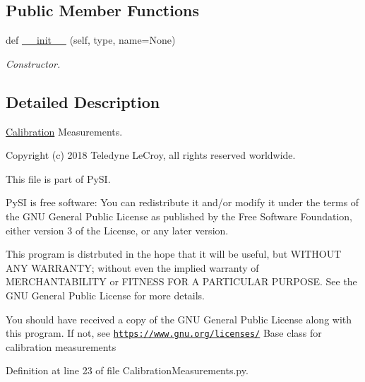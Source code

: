 \subsection*{Public Member Functions}
\begin{DoxyCompactItemize}
\item 
def \hyperlink{classSignalIntegrity_1_1Measurement_1_1Calibration_1_1CalibrationMeasurements_1_1CalibrationMeasurement_a1ddf400813e458d6de6ee54246f050e7}{\+\_\+\+\_\+init\+\_\+\+\_\+} (self, type, name=None)
\begin{DoxyCompactList}\small\item\em Constructor. \end{DoxyCompactList}\end{DoxyCompactItemize}


\subsection{Detailed Description}
\hyperlink{namespaceSignalIntegrity_1_1Measurement_1_1Calibration_1_1Calibration}{Calibration} Measurements. 

Copyright (c) 2018 Teledyne Le\+Croy, all rights reserved worldwide.

This file is part of Py\+SI.

Py\+SI is free software\+: You can redistribute it and/or modify it under the terms of the G\+NU General Public License as published by the Free Software Foundation, either version 3 of the License, or any later version.

This program is distrbuted in the hope that it will be useful, but W\+I\+T\+H\+O\+UT A\+NY W\+A\+R\+R\+A\+N\+TY; without even the implied warranty of M\+E\+R\+C\+H\+A\+N\+T\+A\+B\+I\+L\+I\+TY or F\+I\+T\+N\+E\+SS F\+OR A P\+A\+R\+T\+I\+C\+U\+L\+AR P\+U\+R\+P\+O\+SE. See the G\+NU General Public License for more details.

You should have received a copy of the G\+NU General Public License along with this program. If not, see \href{https://www.gnu.org/licenses/}{\tt https\+://www.\+gnu.\+org/licenses/} Base class for calibration measurements 

Definition at line 23 of file Calibration\+Measurements.\+py.




